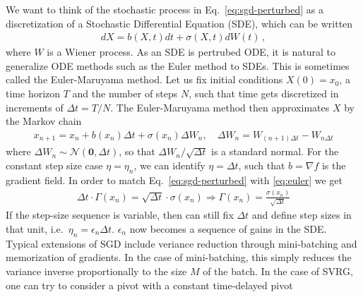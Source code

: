 \documentclass{article}
\begin{document}
We want to think of the  stochastic process in Eq.~\eqref{eq:sgd-perturbed} as a discretization of a Stochastic Differential Equation (SDE), which can be written 
\begin{align}
dX = b(X,t) dt + \sigma(X,t) dW(t)\,,
\end{align}
where $W$ is a Wiener process. As an SDE is pertrubed ODE, it is natural to generalize ODE methods such as the Euler method to SDEs. This is sometimes called the Euler-Maruyama method. Let us fix initial conditions $X(0) = x_0$, a time horizon $T$ and the number of steps $N$, such that time gets discretized in increments of $\Delta t = T/N$. The Euler-Maruyama method then approximates $X$ by the Markov chain 
\begin{align}
x_{n+1} = x_n + b(x_n) \Delta t   + \sigma(x_n) \Delta W_n, \quad \Delta W_{n}=W_{(n+1)\Delta t}-W_{n \Delta t}
\label{eq:euler}
\end{align} 
where $\Delta W_n \sim \mathcal N(\mathbf 0, \Delta t)$, so that $\Delta W_n/ \sqrt{\Delta t}$ is a standard normal. For the constant step size case $\eta = \eta_n$, we can identify $\eta = \Delta t$, such that $b = \nabla f$ is the gradient field. In order to match Eq.~\eqref{eq:sgd-perturbed} with \eqref{eq:euler}  we get 
\begin{align}
\Delta t \cdot \Gamma(x_n) = \sqrt{\Delta t} \cdot \sigma(x_n)  \Rightarrow \Gamma(x_n)  = \frac{\sigma(x_n)}{\sqrt{\Delta t}}
\end{align}
If the step-size sequence is variable, then can still fix $\Delta t$ and define step sizes in that unit, i.e.~$\eta_n = \epsilon_n \Delta t$. $\epsilon_n$ now becomes a sequence of gains in the SDE. \\

Typical extensions of SGD include veriance reduction through mini-batching and memorization of gradients. In the case of mini-batching, this simply reduces the variance inverse proportionally to the size $M$ of the batch. In the case of SVRG, one can try to consider a pivot with a constant time-delayed pivot 

\end{document}
